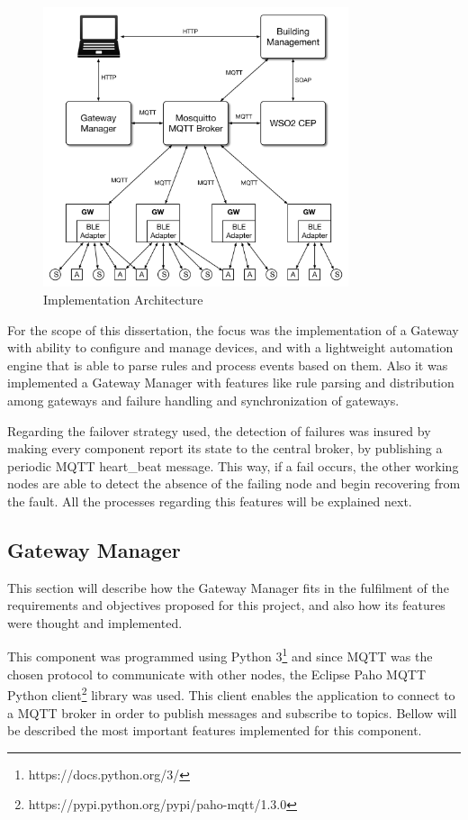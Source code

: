 \begin{figure}[H]
	\centering
	\includegraphics[width=0.8\textwidth]{figures/architecture3.png}
	\caption{Implementation Architecture}
	\label{fig:arch2}
\end{figure}

For the scope of this dissertation, the focus was the implementation of a Gateway with ability to configure and manage devices, and with a lightweight automation engine that is able to parse rules and process events based on them. Also it was implemented a Gateway Manager with features like rule parsing and distribution among gateways and failure handling and synchronization of gateways.

Regarding the failover strategy used, the detection of failures was insured by making every component report its state to the central broker, by publishing a periodic MQTT heart\_beat message. This way, if a fail occurs, the other working nodes are able to detect the absence of the failing node and begin recovering from the fault. All the processes regarding this features will be explained next.


\subsection{Gateway Manager}
\label{arch:gm}

This section will describe how the Gateway Manager fits in the fulfilment of the requirements and objectives proposed for this project, and also how its features were thought and implemented. 


This component was programmed using Python 3\footnote{https://docs.python.org/3/} and since MQTT was the chosen protocol to communicate with other nodes, the Eclipse Paho MQTT Python client\footnote{https://pypi.python.org/pypi/paho-mqtt/1.3.0} library was used. This client enables the application to connect to a MQTT broker in order to publish messages and subscribe to topics. Bellow will be described the most important features implemented for this component.


